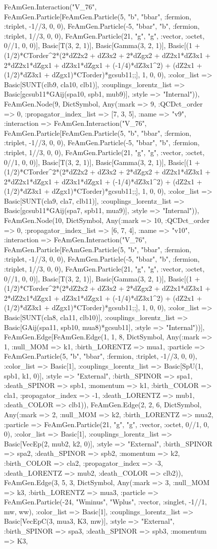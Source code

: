 \documentclass{revtex4}
\begin{document}
\begin{figure}[!htb]
\begin{center}
{FeAmGen.Interaction("V_76", FeAmGen.Particle[FeAmGen.Particle(5, "b", "bbar", :fermion, :triplet, -1//3, 0, 0), FeAmGen.Particle(-5, "bbar", "b", :fermion, :triplet, 1//3, 0, 0), FeAmGen.Particle(21, "g", "g", :vector, :octet, 0//1, 0, 0)], Basic[T(3, 2, 1)], Basic[Gamma(3, 2, 1)], Basic[(1 + (1/2)*CTorder^2*(2*dZ2x2 + dZ3x2 + 2*dZgx2 + dZ2x1*dZ3x1 + 2*dZ2x1*dZgx1 + dZ3x1*dZgx1 + (-1/4)*dZ3x1^2) + (dZ2x1 + (1/2)*dZ3x1 + dZgx1)*CTorder)*gcsub11;;], 1, 0, 0), :color_list => Basic[SUNT(clb9, cla10, clb1)], :couplings_lorentz_list => Basic[gcsub11*GAij(spa10, spb1, mub9)], :style => "Internal")), FeAmGen.Node(9, Dict{Symbol, Any}(:mark => 9, :QCDct_order => 0, :propagator_index_list => [7, 3, 5], :name => "v9", :interaction => FeAmGen.Interaction("V_76", FeAmGen.Particle[FeAmGen.Particle(5, "b", "bbar", :fermion, :triplet, -1//3, 0, 0), FeAmGen.Particle(-5, "bbar", "b", :fermion, :triplet, 1//3, 0, 0), FeAmGen.Particle(21, "g", "g", :vector, :octet, 0//1, 0, 0)], Basic[T(3, 2, 1)], Basic[Gamma(3, 2, 1)], Basic[(1 + (1/2)*CTorder^2*(2*dZ2x2 + dZ3x2 + 2*dZgx2 + dZ2x1*dZ3x1 + 2*dZ2x1*dZgx1 + dZ3x1*dZgx1 + (-1/4)*dZ3x1^2) + (dZ2x1 + (1/2)*dZ3x1 + dZgx1)*CTorder)*gcsub11;;], 1, 0, 0), :color_list => Basic[SUNT(cla9, cla7, clb11)], :couplings_lorentz_list => Basic[gcsub11*GAij(spa7, spb11, mua9)], :style => "Internal")), FeAmGen.Node(10, Dict{Symbol, Any}(:mark => 10, :QCDct_order => 0, :propagator_index_list => [6, 7, 4], :name => "v10", :interaction => FeAmGen.Interaction("V_76", FeAmGen.Particle[FeAmGen.Particle(5, "b", "bbar", :fermion, :triplet, -1//3, 0, 0), FeAmGen.Particle(-5, "bbar", "b", :fermion, :triplet, 1//3, 0, 0), FeAmGen.Particle(21, "g", "g", :vector, :octet, 0//1, 0, 0)], Basic[T(3, 2, 1)], Basic[Gamma(3, 2, 1)], Basic[(1 + (1/2)*CTorder^2*(2*dZ2x2 + dZ3x2 + 2*dZgx2 + dZ2x1*dZ3x1 + 2*dZ2x1*dZgx1 + dZ3x1*dZgx1 + (-1/4)*dZ3x1^2) + (dZ2x1 + (1/2)*dZ3x1 + dZgx1)*CTorder)*gcsub11;;], 1, 0, 0), :color_list => Basic[SUNT(cla8, cla11, clb10)], :couplings_lorentz_list => Basic[GAij(spa11, spb10, mua8)*gcsub11], :style => "Internal"))], FeAmGen.Edge[FeAmGen.Edge(1, 1, 8, Dict{Symbol, Any}(:mark => 1, :null_MOM => k1, :birth_LORENTZ => mua1, :particle => FeAmGen.Particle(5, "b", "bbar", :fermion, :triplet, -1//3, 0, 0), :color_list => Basic[1], :couplings_lorentz_list => Basic[SpU(1, spb1, k1, 0)], :style => "External", :birth_SPINOR => spa1, :death_SPINOR => spb1, :momentum => k1, :birth_COLOR => cla1, :propagator_index => -1, :death_LORENTZ => mub1, :death_COLOR => clb1)), FeAmGen.Edge(2, 2, 6, Dict{Symbol, Any}(:mark => 2, :null_MOM => k2, :birth_LORENTZ => mua2, :particle => FeAmGen.Particle(21, "g", "g", :vector, :octet, 0//1, 0, 0), :color_list => Basic[1], :couplings_lorentz_list => Basic[VecEp(2, mub2, k2, 0)], :style => "External", :birth_SPINOR => spa2, :death_SPINOR => spb2, :momentum => k2, :birth_COLOR => cla2, :propagator_index => -3, :death_LORENTZ => mub2, :death_COLOR => clb2)), FeAmGen.Edge(3, 5, 3, Dict{Symbol, Any}(:mark => 3, :null_MOM => k3, :birth_LORENTZ => mua3, :particle => FeAmGen.Particle(-24, "Wminus", "Wplus", :vector, :singlet, -1//1, mw, ww), :color_list => Basic[1], :couplings_lorentz_list => Basic[VecEpC(3, mua3, K3, mw)], :style => "External", :birth_SPINOR => spa3, :death_SPINOR => spb3, :momentum => K3, }
\end{center}
\end{figure}
\end{document}
